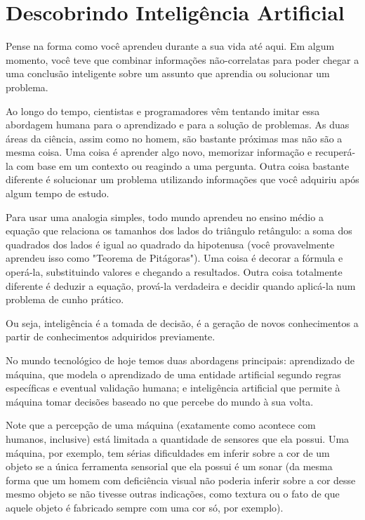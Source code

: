 \documentclass[11pt,a4paper,twoside,openany]{book}
\begin{document}
\chapter*{Descobrindo Inteligência Artificial}

Pense na forma como você aprendeu durante a sua vida até aqui. Em algum momento, você teve que combinar informações não-correlatas para poder chegar a uma conclusão inteligente sobre um assunto que aprendia ou solucionar um problema.

Ao longo do tempo, cientistas e programadores vêm tentando imitar essa abordagem humana para o aprendizado e para a solução de problemas. As duas áreas da ciência, assim como no homem, são bastante próximas mas não são a mesma coisa. Uma coisa é aprender algo novo, memorizar informação e recuperá-la com base em um contexto ou reagindo a uma pergunta. Outra coisa bastante diferente é solucionar um problema utilizando informações que você adquiriu após algum tempo de estudo. 

Para usar uma analogia simples, todo mundo aprendeu no ensino médio a equação que relaciona os tamanhos dos lados do triângulo retângulo: a soma dos quadrados dos lados é igual ao quadrado da hipotenusa (você provavelmente aprendeu isso como "Teorema de Pitágoras"). Uma coisa é decorar a fórmula e operá-la, substituindo valores e chegando a resultados. Outra coisa totalmente diferente é deduzir a equação, prová-la verdadeira e decidir quando aplicá-la num problema de cunho prático.

Ou seja, inteligência é a tomada de decisão, é a geração de novos conhecimentos a partir de conhecimentos adquiridos previamente.

No mundo tecnológico de hoje temos duas abordagens principais: aprendizado de máquina, que modela o aprendizado de uma entidade artificial segundo regras específicas e eventual validação humana; e inteligência artificial que permite à máquina tomar decisões baseado no que percebe do mundo à sua volta.

Note que a percepção de uma máquina (exatamente como acontece com humanos, inclusive) está limitada a quantidade de sensores que ela possui. Uma máquina, por exemplo, tem sérias dificuldades em inferir sobre a cor de um objeto se a única ferramenta sensorial que ela possui é um sonar (da mesma forma que um homem com deficiência visual não poderia inferir sobre a cor desse mesmo objeto se não tivesse outras indicações, como textura ou o fato de que aquele objeto é fabricado sempre com uma cor só, por exemplo).
\end{document}
